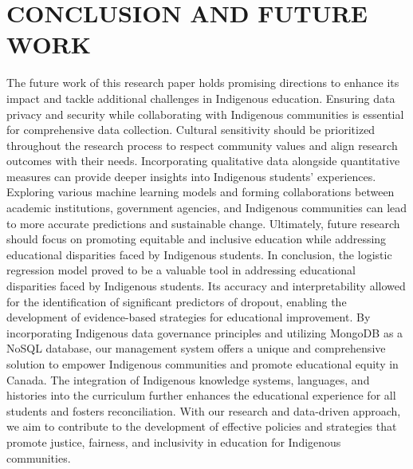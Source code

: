 \documentclass[a4paper,twoside]{article}
\begin{document}
\section{\uppercase{Conclusion and Future Work}}
The future work of this research paper holds promising directions to enhance its impact and tackle additional challenges in Indigenous education. Ensuring data privacy and security while collaborating with Indigenous communities is essential for comprehensive data collection. Cultural sensitivity should be prioritized throughout the research process to respect community values and align research outcomes with their needs. Incorporating qualitative data alongside quantitative measures can provide deeper insights into Indigenous students' experiences. Exploring various machine learning models and forming collaborations between academic institutions, government agencies, and Indigenous communities can lead to more accurate predictions and sustainable change. Ultimately, future research should focus on promoting equitable and inclusive education while addressing educational disparities faced by Indigenous students. In conclusion, the logistic regression model proved to be a valuable tool in addressing educational disparities faced by Indigenous students. Its accuracy and interpretability allowed for the identification of significant predictors of dropout, enabling the development of evidence-based strategies for educational improvement. By incorporating Indigenous data governance principles and utilizing MongoDB as a NoSQL database, our management system offers a unique and comprehensive solution to empower Indigenous communities and promote educational equity in Canada. The integration of Indigenous knowledge systems, languages, and histories into the curriculum further enhances the educational experience for all students and fosters reconciliation. With our research and data-driven approach, we aim to contribute to the development of effective policies and strategies that promote justice, fairness, and inclusivity in education for Indigenous communities.

\newpage

{\small
}
\end{document}
